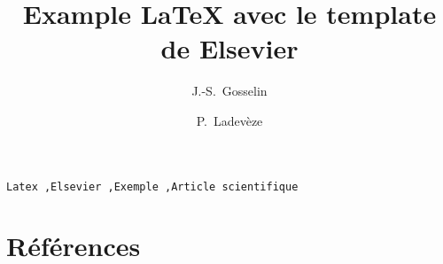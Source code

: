 


\begin{frontmatter} 

\title{Example \LaTeX{} avec le template de Elsevier}

\author[inrs]{J.-S.~Gosselin}
\author[cgc]{P.~Ladevèze}

\address[inrs]{Institut national de la recherche scientifique, Centre Eau Terre Environnement, 490 rue de la Couronne, Quebec City, Quebec, Canada}
\address[cgc]{Geological Survey of Canada, Quebec Division, 490 rue de la Couronne, Quebec City, Quebec, Canada}

\begin{abstract}
    
\end{abstract}

\begin{keyword}
    \texttt{Latex \sep  Elsevier \sep Exemple \sep Article scientifique}
\end{keyword}
  
\end{frontmatter}

\linenumbers








\section*{Références} 



